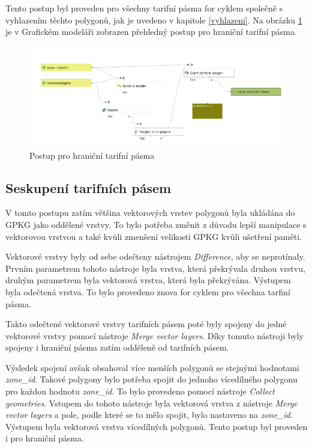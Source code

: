 Tento postup byl proveden pro všechny tarifní pásma for cyklem společně s vyhlazením těchto polygonů,
jak je uvedeno v kapitole \ref{vyhlazeni}. Na obrázku \ref{fig:postup-border-zones} je v Grafickém modeláři zobrazen
přehledný postup pro hraniční tarifní pásma. 

\begin{figure}[H] \centering
    \includegraphics[width=400pt]{./pictures/postup-border-zones.png}
    \caption[Postup pro hraniční tarifní pásma]{Postup pro hraniční tarifní pásma}
	\label{fig:postup-border-zones}              
\end{figure}

\subsection{Seskupení tarifních pásem}

V tomto postupu zatím většina vektorových vrstev polygonů byla ukládána do GPKG jako oddělené vrstvy.
To bylo potřeba změnit z důvodu lepší manipulace s vektorovou vrstvou a také kvůli zmenšení velikosti GPKG
kvůli ušetření paměti.

Vektorové vrstvy byly od sebe odečteny nástrojem \textit{Difference}, aby se neprotínaly. 
Prvním parametrem tohoto nástroje byla vrstva, která překrývala druhou vrstvu, 
druhým parametrem byla vektorová vrstva, která byla překrývána. Výstupem byla odečtená vrstva.
To bylo provedeno znova for cyklem pro všechna tarfiní pásma.

Takto odečtené vektorové vrstvy tarifních pásem poté byly spojeny do jedné vektorové vrstvy pomocí 
nástroje \textit{Merge vector layers}. Díky tomuto nástroji byly spojeny i hraniční pásma zatím odděleně od tarifních pásem.

Výsledek spojení avšak obsahoval více menších polygonů se stejnými hodnotami \textit{zone\_id}.
Takové polygony bylo potřeba spojit do jednoho vícedílného polygonu pro každou hodnotu \textit{zone\_id}.
To bylo provedeno pomocí nástroje \textit{Collect geometries}. Vstupem do tohoto nástroje byla vektorová vrstva z 
nástroje \textit{Merge vector layers} a pole, podle které se to mělo spojit, bylo nastaveno na \textit{zone\_id}.
Výstupem byla vektorová vrstva vícedílných polygonů. Tento postup byl proveden i pro hraniční pásma.

